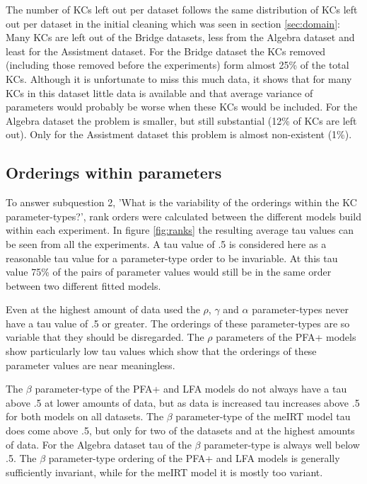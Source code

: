 \documentclass{scrartcl}
\begin{document}
The number of KCs left out per dataset follows the same distribution of KCs left out per dataset in the initial cleaning which was seen in section \ref{sec:domain}: Many KCs are left out of the Bridge datasets, less from the Algebra dataset and least for the Assistment dataset. For the Bridge dataset the KCs removed (including those removed before the experiments) form almost 25\% of the total KCs. Although it is unfortunate to miss this much data, it shows that for many KCs in this dataset little data is available and that average variance of parameters would probably be worse when these KCs would be included. For the Algebra dataset the problem is smaller, but still substantial (12\% of KCs are left out). Only for the Assistment dataset this problem is almost non-existent (1\%).

\subsection{Orderings within parameters}
To answer subquestion 2, 'What is the variability of the orderings within the KC parameter-types?', rank orders were calculated between the different models build within each experiment. In figure \ref{fig:ranks} the resulting average tau values can be seen from all the experiments. A tau value of .5 is considered here as a reasonable tau value for a parameter-type order to be invariable. At this tau value 75\% of the pairs of parameter values would still be in the same order between two different fitted models.

Even at the highest amount of data used the $\rho$, $\gamma$ and $\alpha$ parameter-types never have a tau value of .5 or greater. The orderings of these parameter-types are so variable that they should be disregarded. The $\rho$ parameters of the PFA+ models show particularly low tau values which show that the orderings of these parameter values are near meaningless.

The $\beta$ parameter-type of the PFA+ and LFA models do not always have a tau above .5 at lower amounts of data, but as data is increased tau increases above .5 for both models on all datasets. The $\beta$ parameter-type of the meIRT model tau does come above .5, but only for two of the datasets and at the highest amounts of data. For the Algebra dataset tau of the $\beta$ parameter-type is always well below .5. The $\beta$ parameter-type ordering of the PFA+ and LFA models is generally sufficiently invariant, while for the meIRT model it is mostly too variant.
\end{document}
